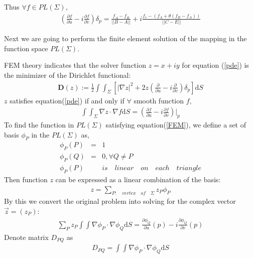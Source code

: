 \documentclass{InsightArticle}
\begin{document}
  Thus $\forall f \in PL(\Sigma)$, 
  \begin{eqnarray}  
     (\frac{\partial f}{\partial u} - i\frac{\partial f}{\partial v})\delta_p = 
     \frac{f_A - f_B}{|| B - A ||} + i\frac{f_c-(f_A + \theta(f_B - f_A))}{||C - E||} \label{Rinteqn}
  \end{eqnarray}  
  
  Next we are going to perform the finite element solution of the mapping in the function space $PL(\Sigma)$.
  
  FEM theory indicates that the solver function $z=x+iy$ for equation (\ref{pde}) is the minimizer
  of the Dirichlet functional:    
  \begin{eqnarray}  
      \mathbf{D}(z):=\frac{1}{2}\int\int_{\Sigma}[ |\nabla z|^2 + 2z (\frac{\partial}{\partial u} - i\frac{\partial}{\partial v})\delta_p ]\mathrm{d}S \label{DirichletFunctional}
  \end{eqnarray}      
  $z$ satisfies equation(\ref{pde}) if and only if $\forall$ smooth function $f$,    
  \begin{eqnarray}  
      \int\int_{\Sigma} \nabla z \cdot \nabla f \mathrm{d}S = (\frac{\partial f}{\partial u} - i\frac{\partial f}{\partial v})|_p \label{FEM}
  \end{eqnarray}    
  To find the function in $PL(\Sigma)$ satisfying equation(\ref{FEM}), we define a set of basis $\phi_P$ in the $PL(\Sigma)$ as,
  \begin{eqnarray}  
      \phi_P(P) &=& 1 \nonumber \\
      \phi_P(Q) &=& 0, \forall Q \ne P \nonumber \\
      \phi_P(P) && is \quad linear \quad on \quad each \quad triangle \label{basis}
  \end{eqnarray}  
  Then function $z$ can be expressed as a linear combination of the basis:  
  \begin{eqnarray}  
      z = \sum_{P:\quad vertex \quad of \quad \Sigma} z_P \phi_P \label{zInBasis}
  \end{eqnarray}  
  By this we convert the original problem into solving for the complex vector $\vec{z}=(z_P)$:  
   \begin{eqnarray}  
      \sum_P z_P \int\int \nabla \phi_P \cdot \nabla \phi_Q \mathrm{d}S = \frac{\partial \phi_Q}{\partial u}(p) - i \frac{\partial \phi_Q}{\partial v}(p)
      \label{allQ}
  \end{eqnarray}  
  Denote matrix $D_{PQ}$ as
   \begin{eqnarray}  
      D_{PQ} = \int\int \nabla \phi_P \cdot \nabla \phi_Q \mathrm{d}S  \label{Dpq}
  \end{eqnarray}  
\end{document}
